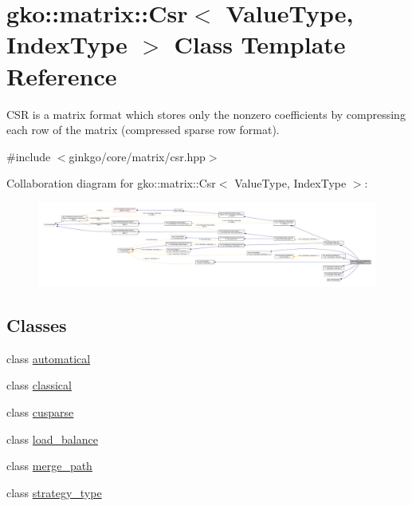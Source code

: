 \hypertarget{classgko_1_1matrix_1_1Csr}{}\section{gko\+:\+:matrix\+:\+:Csr$<$ Value\+Type, Index\+Type $>$ Class Template Reference}
\label{classgko_1_1matrix_1_1Csr}


C\+SR is a matrix format which stores only the nonzero coefficients by compressing each row of the matrix (compressed sparse row format).  




{\ttfamily \#include $<$ginkgo/core/matrix/csr.\+hpp$>$}



Collaboration diagram for gko\+:\+:matrix\+:\+:Csr$<$ Value\+Type, Index\+Type $>$\+:
\nopagebreak
\begin{figure}[H]
\begin{center}
\leavevmode
\includegraphics[width=350pt]{classgko_1_1matrix_1_1Csr__coll__graph}
\end{center}
\end{figure}
\subsection*{Classes}
\begin{DoxyCompactItemize}
\item 
class \hyperlink{classgko_1_1matrix_1_1Csr_1_1automatical}{automatical}
\item 
class \hyperlink{classgko_1_1matrix_1_1Csr_1_1classical}{classical}
\item 
class \hyperlink{classgko_1_1matrix_1_1Csr_1_1cusparse}{cusparse}
\item 
class \hyperlink{classgko_1_1matrix_1_1Csr_1_1load__balance}{load\+\_\+balance}
\item 
class \hyperlink{classgko_1_1matrix_1_1Csr_1_1merge__path}{merge\+\_\+path}
\item 
class \hyperlink{classgko_1_1matrix_1_1Csr_1_1strategy__type}{strategy\+\_\+type}
\end{DoxyCompactItemize}
